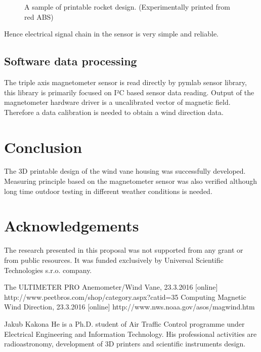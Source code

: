 \documentclass{poster16}
\begin{document}
\begin{figure}[ht]
\begin{center}
\caption{A sample of printable rocket design. (Experimentally printed from red ABS)} 
\label{fig:slip_ring}
\end{center}
\end{figure}

Hence electrical signal chain in the sensor is very simple and reliable. 

\subsection{Software data processing}

The triple axis magnetometer sensor is read directly by pymlab sensor library, this library is primarily focused on I²C based sensor data reading.
Output of the magnetometer hardware driver is a uncalibrated vector of magnetic field.  Therefore a data calibration is needed to obtain a wind direction data. 



\section{Conclusion}

The 3D printable design of the wind vane housing was successfully developed. Measuring principle based on the magnetometer sensor was also verified although long time outdoor testing in different weather conditions is needed.


\section*{Acknowledgements}

The research presented in this proposal was not supported from any grant or from public resources. It was funded exclusively by Universal Scientific Technologies s.r.o. company. 

\begin{thebibliography}{9}
The ULTIMETER PRO Anemometer/Wind Vane, 23.3.2016 [online] http://www.peetbros.com/shop/category.aspx?catid=35
Computing Magnetic Wind Direction, 23.3.2016 [online] http://www.nws.noaa.gov/asos/magwind.htm
\end{thebibliography}


\begin{authorcv}{Jakub Kakona}
He is a Ph.D. student of  Air Traffic Control programme under Electrical Engineering and Information Technology. His professional activities are radioastronomy, development of 3D printers and scientific instruments design. 
\end{authorcv}
\end{document}
